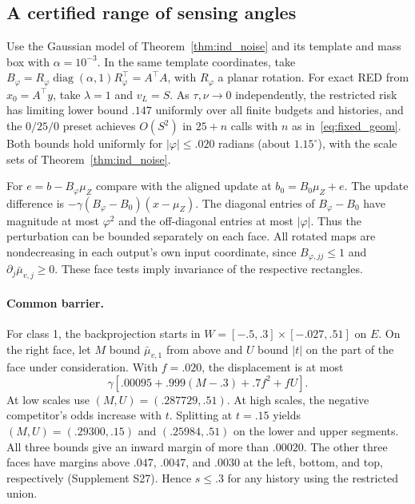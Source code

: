 \subsection{A certified range of sensing angles}\label{sec:sensing_angle}
\begin{corollary}\label{cor:sensing_angle}
Use the Gaussian model of Theorem~\ref{thm:ind_noise} and its
template and mass box with $\alpha=10^{-3}$. In the same template
coordinates, take $B_\varphi=R_\varphi\operatorname{diag}(\alpha,1)
R_\varphi^\top=A^\top A$, with $R_\varphi$ a planar rotation.
For exact RED from $x_0=A^\top y$, take $\lambda=1$ and $v_L=S$.
As $\tau,\nu\to0$ independently, the restricted risk has limiting
lower bound $.147$ uniformly over all finite budgets and histories,
and the $0/25/0$ preset achieves $O(S^2)$ in $25+n$ calls with
$n$ as in~\eqref{eq:fixed_geom}. Both bounds hold uniformly for
$|\varphi|\le .020$ radians (about $1.15^\circ$), with the scale sets
of Theorem~\ref{thm:ind_noise}.
\end{corollary}

For $e=b-B_\varphi\mu_Z$ compare with the aligned update at
$b_0=B_0\mu_Z+e$. The update difference is
$-\gamma(B_\varphi-B_0)(x-\mu_Z)$.
The diagonal entries of $B_\varphi-B_0$ have magnitude at most
$\varphi^2$ and the off-diagonal entries at most $|\varphi|$.
Thus the perturbation can be bounded separately on each face.
All rotated maps are nondecreasing in each output's own input
coordinate, since $B_{\varphi,jj}\le1$ and
$\partial_j\bar\mu_{v,j}\ge0$. These face tests imply invariance
of the respective rectangles.

\paragraph{Common barrier.}
For class 1, the backprojection starts in
$W=[-.5,.3]\times[-.027,.51]$ on $E$.
On the right face, let $M$ bound $\bar\mu_{v,1}$ from above
and $U$ bound $|t|$ on the part of the face under consideration.
With $f=.020$, the displacement is at most
\[
 \gamma[.00095+.999(M-.3)+.7f^2+fU].
\]
At low scales use $(M,U)=(.287729,.51)$. At high scales,
the negative competitor's odds increase with $t$.
Splitting at $t=.15$ yields $(M,U)=(.29300,.15)$ and
$(.25984,.51)$ on the lower and upper segments.
All three bounds give an inward margin of more than $.00020$.
The other three faces
have margins above $.047$, $.0047$, and $.0030$ at the left,
bottom, and top, respectively (Supplement S27). Hence $s\le.3$
for any history using the restricted union.

